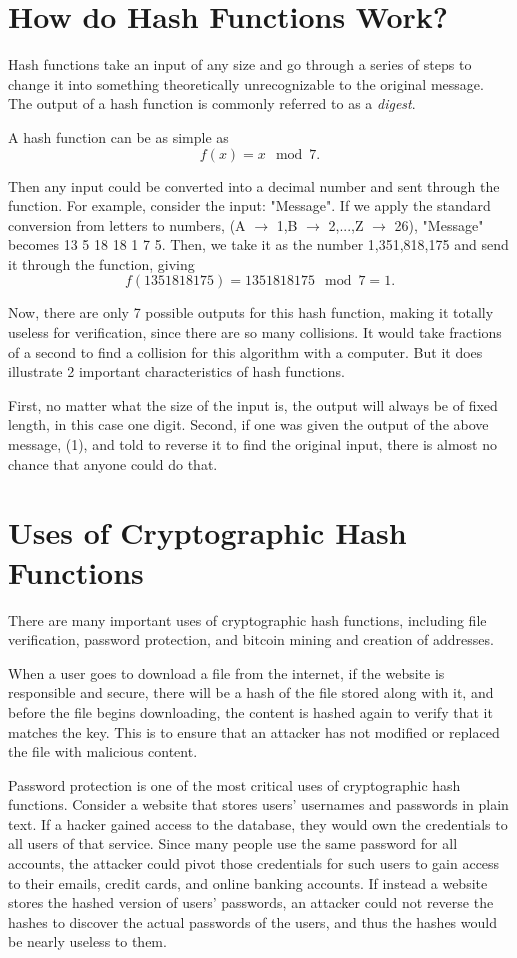 \documentclass{article}
\begin{document}
\section{How do Hash Functions Work?}
Hash functions take an input of any size and go through a series of steps to change it into something theoretically unrecognizable to the original message.
The output of a hash function is commonly referred to as a \textit{digest}.

A hash function can be as simple as $$f(x) = x\mod7.$$
		
Then any input could be converted into a decimal number and sent through the function. For example, consider the input: "Message". If we apply the standard conversion from letters to numbers, (A $\rightarrow$ 1,B $\rightarrow$ 2,...,Z $\rightarrow$ 26), "Message" becomes 13 5 18 18 1 7 5. Then, we take it as the number 1,351,818,175 and send it through the function, giving $$f(1351818175) = 1351818175 \mod 7 = 1.$$

Now, there are only 7 possible outputs for this hash function, making it totally useless for verification, since there are so many collisions. It would take fractions of a second to find a collision for this algorithm with a computer. But it does illustrate 2 important characteristics of hash functions. 

First, no matter what the size of the input is, the output will always be of fixed length, in this case one digit. Second, if one was given the output of the above message, (1), and told to reverse it to find the original input, there is almost no chance that anyone could do that.

\section{Uses of Cryptographic Hash Functions}
\tab There are many important uses of cryptographic hash functions, including file verification, password protection, and bitcoin mining and creation of addresses.

When a user goes to download a file from the internet, if the website is responsible and secure, there will be a hash of the file stored along with it, and before the file begins downloading, the content is hashed again to verify that it matches the key. This is to ensure that an attacker has not modified or replaced the file with malicious content.

Password protection is one of the most critical uses of cryptographic hash functions. Consider a website that stores users' usernames and passwords in plain text. If a hacker gained access to the database, they would own the credentials to all users of that service. Since many people use the same password for all accounts, the attacker could pivot those credentials for such users to gain access to their emails, credit cards, and online banking accounts. 
If instead a website stores the hashed version of users' passwords, an attacker could not reverse the hashes to discover the actual passwords of the users, and thus the hashes would be nearly useless to them.
\end{document}

